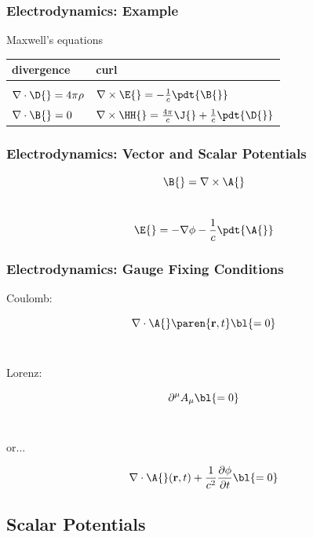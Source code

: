 \documentclass[]{beamer}
\begin{document}
\begin{frame}      %
\frametitle{Electrodynamics: Example}
  Maxwell's equations \\
\begin{table}[htdp]
  \begin{center}
    \begin{tabular}{ll}
      divergence & curl \\\hline
      \\
      $\nabla \cdot \D{} = 4 \pi \rho$ &
      $\nabla \times \E{} = - \frac{1}{c} \pdt{\B{}}$ \\[10pt]
      $\nabla \cdot \B{} = 0$ &
      $\nabla \times \HH{} = \frac{4\pi}{c} \J{} + \frac{1}{c} \pdt{\D{}}$
    \end{tabular}
  \end{center}
\end{table}%
\end{frame}

\begin{frame}
  \frametitle{Electrodynamics: Vector and Scalar Potentials}  %
  $$\B{} = \nabla \times \A{}$$\\[20pt]
  $$\E{} = - \nabla \phi - \frac{1}{c} \pdt{\A{}}$$
\end{frame}

\begin{frame}      %
\frametitle{Electrodynamics: Gauge Fixing Conditions}
  \begin{center}
  Coulomb:
  \end{center}
  $$ \nabla \cdot \A{}\paren{\mathbf{r}, t} \bl{ = 0}$$ \\[20pt]
  \begin{center}
  Lorenz:
  \end{center}
  $$ \partial^{\mu} A_{\mu} \bl{ = 0}$$ \\
  \begin{center}
     or...
  \end{center}
  $$ \nabla \cdot {\A{}}({\bf{r}}, t) + \frac{1}{c^{2}} \frac{\partial \phi}{\partial t} \bl{= 0}$$
\end{frame}

\subsection{Scalar Potentials}
\end{document}
